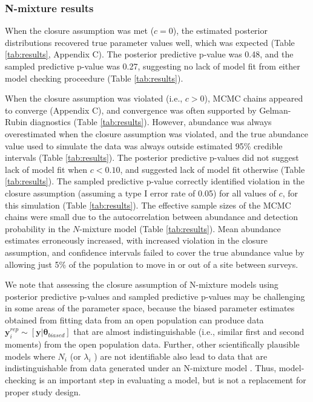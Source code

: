 \documentclass[12pt,english]{article}
\begin{document}
\begin{spacing}{1.9}
\subsubsection{N-mixture results}
When the closure assumption was met ($c=0$), the estimated posterior
distributions recovered true parameter values well, which was expected
(Table \ref{tab:results}, Appendix C). The posterior predictive
p-value was 0.48, and the sampled predictive p-value was 0.27,
suggesting no lack of model fit from either model checking proceedure
(Table \ref{tab:results}).

When the closure assumption was violated (i.e., $c>0$), MCMC chains
appeared to converge (Appendix C), and convergence was often supported
by Gelman-Rubin diagnostics (Table \ref{tab:results}).  However,
abundance was always overestimated when the closure assumption was
violated, and the true abundance value used to simulate the data was
always outside estimated 95\% credible intervals (Table
\ref{tab:results}). The posterior predictive p-values did not suggest
lack of model fit when $c<0.10$, and suggested lack of model fit
otherwise (Table \ref{tab:results}). The sampled predictive p-value
correctly identified violation in the closure assumption (assuming a
type I error rate of 0.05) for all values of $c$, for this simulation
(Table \ref{tab:results}). The effective sample sizes of the MCMC
chains were small due to the autocorrelation between abundance and
detection probability in the $N$-mixture model (Table
\ref{tab:results}). Mean abundance estimates erroneously increased,
with increased violation in the closure assumption, and confidence
intervals failed to cover the true abundance value by allowing just
5\% of the population to move in or out of a site between surveys.

We note that assessing the closure assumption of N-mixture models
using posterior predictive p-values and sampled predictive p-values
may be challenging in some areas of the parameter space, because the
biased parameter estimates obtained from fitting data from an open
population can produce data
$\textbf{y}_i^{rep}\sim [\textbf{y}|\boldsymbol{\theta}_{biased}]$
that are almost indistinguishable (i.e., similar first and second
moments) from the open population data. Further, other scientifically
plausible models where $N_i$ (or $\lambda_i$ ) are not identifiable
also lead to data that are indistinguishable from data generated under
an N-mixture model \citep{BarkerEtAl2017}. Thus, model-checking is an
important step in evaluating a model, but is not a replacement for
proper study design.




\end{spacing}
\end{document}
